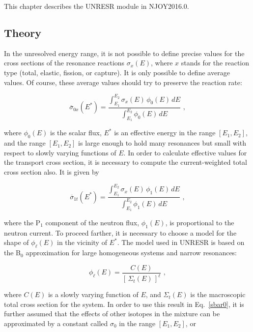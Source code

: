 This chapter describes the UNRESR module in NJOY2016.0.

\subsection{Theory}
\label{ssUNRESR_theory}

In the unresolved energy range, it is not possible to define
precise values for the cross sections of the resonance reactions
$\sigma_x(E)$, where $x$ stands for the reaction type (total,
elastic, fission, or capture).  It is only possible to define
average values.  Of course, these average values should try
to preserve the reaction rate:

\begin{equation}
   \overline{\sigma}_{0x}(E^*)=\frac
     {\displaystyle\int_{E_1}^{E_2}\sigma_x(E)\,\phi_0(E)\,dE}
     {\displaystyle\int_{E_1}^{E_2}\phi_0(E)\,dE}\,\,,
\label{sbar0}
\end{equation}

\noindent
where $\phi_0(E)$ is the scalar flux, $E^*$ is an effective energy
in the range $[E_1,E_2]$, and the range $[E_1,E_2]$ is large
enough to hold many resonances but small with respect to
slowly varying functions of $E$.  In order to calculate
effective values for the transport cross section, it is
necessary to compute the current-weighted total cross
section also.  It is given by

\begin{equation}
   \overline{\sigma}_{1t}(E^*)=\frac
     {\displaystyle\int_{E_1}^{E_2}\sigma_x(E)\,\phi_1(E)\,dE}
     {\displaystyle\int_{E_1}^{E_2}\phi_1(E)\,dE}\,\,,
\end{equation}

\noindent
where the P$_1$ component of the neutron flux, $\phi_1(E)$, is
proportional to the neutron current.  To proceed farther, it is
necessary to choose a model for the shape of $\phi_\ell(E)$ in the
vicinity of $E^*$.  The model used in UNRESR is based on the
B$_0$ approximation for large homogeneous systems and narrow
resonances:

\begin{equation}
   \phi_\ell(E)=\frac{C(E)}{[\,\Sigma_t(E)\,]^\ell}\,\,,
\end{equation}

\noindent
where $C(E)$ is a slowly varying function of $E$, and
$\Sigma_t(E)$ is the macroscopic total cross
section for the system.  In order to use this result in
Eq.~\ref{sbar0}, it is further assumed that the effects of other
isotopes in the mixture can be approximated by a constant called
$\sigma_0$ in the range $[E_1,E_2]$, or

